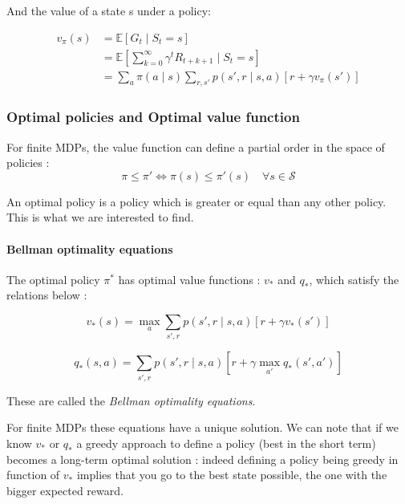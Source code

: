 \documentclass[14pt,a4paper]{article}
\def\iff{\Leftrightarrow}
\theoremstyle{definition}
\begin{document}
And the value of a state s under a policy:


\begin{equation}
\begin{split}
v_{\pi}(s)&= \mathbb{E}[G_t \mid S_t=s]
\\&= \mathbb{E}[ \sum_{k=0}^{\infty}\gamma^t R_{t+k+1} \mid S_t = s ]
\\& =\sum_{a}\pi(a\mid s)\sum_{r,s'}p(s',r\mid s,a)[r+\gamma v_{\pi}(s')]
\end{split}
\label{v(s)}
\end{equation}

\subsubsection{Optimal policies and Optimal value function}

For finite MDPs, the value function can define a partial order in the space of policies : 
$$ 
\pi\leq \pi' \iff \pi (s)\leq \pi' (s) \quad \forall s \in \mathcal{S}
$$

An optimal policy is a policy which is greater or equal than any other policy. This is what we are interested to find.

\paragraph{Bellman optimality equations}

The optimal policy $\pi^*$ has  optimal value functions : $v_* $ and $ q_*$, which satisfy the relations below : 

\begin{equation}
v_{*}(s)=\max_{a} \sum_{s',r}p(s',r\mid s,a)[r+\gamma v_{*}(s')]
\label{bellman_opt_v}
\end{equation}

\begin{equation}
q_{*}(s,a)= \sum_{s',r}p(s',r \mid s,a)[r+\gamma \max_{a'}q_{*}(s',a')]
\label{bellman_opt_q}
\end{equation}

These are called the \emph{Bellman optimality equations}.


For finite MDPs these equations have a unique solution. We can note that if we know $v_{*}$ or $q_{*}$ a greedy approach to define a policy (best in the short term) becomes a long-term optimal solution : indeed defining a policy being greedy in function of $v_*$ implies that you go to the best state possible, the one with the bigger expected reward.
\end{document}
